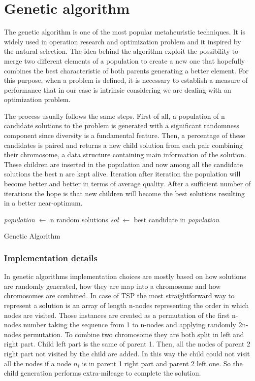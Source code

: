 \section{Genetic algorithm}
The genetic algorithm is one of the most popular metaheuristic techniques. It is
widely used in operation research and optimization problem and it inspired by
the natural selection. The idea behind the algorithm exploit the possibility to
merge two different elements of a population to create a new one that hopefully
combines the best characteristic of both parents generating a better element.
For this purpose, when a problem is defined, it is necessary to establish a
measure of performance that in our case is intrinsic considering we are dealing
with an optimization problem. 

\newpage
The process usually follows the same steps. First of all, a population of n
candidate solutions to the problem is generated with a significant randomness
component since diversity is a fundamental feature. Then, a percentage of these
candidates is paired and returns a new child solution from each pair combining
their chromosome, a data structure containing main information of the solution.
These children are inserted in the population and now among all the candidate
solutions the best n are kept alive. Iteration after iteration the population
will become better and better in terms of average quality. After a sufficient
number of iterations the hope is that new children will become the best
solutions resulting in a better near-optimum.

\begin{algorithm}[H]
\SetAlgoLined
{}
    \emph{population} $\leftarrow$ n random solutions\;
    \emph{sol} $\leftarrow$ best candidate in \emph{population}
    \caption{Genetic Algorithm}
\end{algorithm}

\subsubsection{Implementation details}
In genetic algorithms implementation choices are mostly based on how solutions
are randomly generated, how they are map into a chromosome and how chromosomes
are combined. In case of TSP the most straightforward way to represent a
solution is an array of length n-nodes representing the order in which nodes are
visited. Those instances are created as a permutation of the first n-nodes
number taking the sequence from 1 to n-nodes and applying randomly $2$n-nodes
permutation. To combine two chromosome they are both split in left and right
part. Child left part is the same of parent 1. Then, all the nodes of parent 2
right part not visited by the child are added. In this way the child could not
visit all the nodes if a node $n_i$ is in parent 1 right part and parent 2 left
one. So the child generation performs extra-mileage to complete the solution. 

